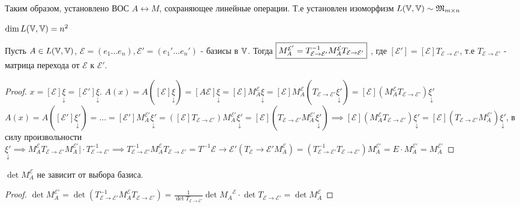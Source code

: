 \documentclass[../main.tex]{subfiles}
\begin{document}
Таким образом, установлено ВОС $A \leftrightarrow M$, сохраняющее линейные операции. Т.е установлен изоморфизм $L (\mathbb{V},\mathbb{V}) \sim \mathfrak{M}_{m\times n}$
\begin{corollary}
    $\dim{L(\ensuremath{\mathbb{V}},\ensuremath{\mathbb{V}})}=n^{2}$
\end{corollary}
\begin{theorem}
    Пусть $A \in L(\mathbb{V},\mathbb{V})$, $\mathcal{E}=(e_{1} \dots e_{n}),  \mathcal{E'} = (e_{1}' \dots e_{n}')$ - базисы в $\mathbb{V}$. Тогда $\fbox{$M_{A}^{\mathcal{E'}}= T_{\mathcal{E} \to \mathcal{E'}}^{-1}  M_{A}^{\mathcal{E}}  T_{\mathcal{E} \to \mathcal{E'}}$}$\; , где $[\mathcal{E'}] = [\mathcal{E}]T_{\mathcal{E} \to \mathcal{E'}}$, т.е $T_{\mathcal{E} \to \mathcal{E'}}$ - матрица перехода от $\mathcal{E}$ к $\mathcal{E'}$.
\end{theorem}
\begin{proof}
    $x= [\mathcal{E}]\underset{\downarrow}{\xi}= [\mathcal{E'}]\underset{\downarrow}{\xi}$. $A(x)= A([\mathcal{E}]\underset{\downarrow}{\xi})= [A\mathcal{E}] \underset{\downarrow}{\xi} = [\mathcal{E}]M_{A}^{\mathcal{E}}\underset{\downarrow}{\xi} = [\mathcal{E}]M_{A}^{\mathcal{E}}(T_{\mathcal{E}\to\mathcal{E'}} \underset{\downarrow}{\xi'}) = [\mathcal{E}](M_{A}^{\mathcal{E}}T_{\mathcal{E}\to\mathcal{E'}})\underset{\downarrow}{\xi'}$
    \\$A(x)=A([\mathcal{E'}]\underset{\downarrow}{\xi'})=\dots=[\mathcal{E'}]M_{A}^{\mathcal{E'}}\underset{\downarrow}{\xi'}= ([\mathcal{E}]T_{\mathcal{E}\to\mathcal{E'}})M_{A}^{\mathcal{E'}}\underset{\downarrow}{\xi'}= [\mathcal{E}](T_{\mathcal{E}\to\mathcal{E'}}M_{A}^{\mathcal{E'}}\underset{\downarrow}{\xi'})\implies [\mathcal{E}](M_{A}^{\mathcal{E}}T_{\mathcal{E}\to\mathcal{E'}})\underset{\downarrow}{\xi'}= [\mathcal{E}](T_{\mathcal{E}\to \mathcal{E'}}M_{A}^{\mathcal{E'}})\underset{\downarrow}{\xi'}$, в силу произвольности $\underset{\downarrow}{\xi'}\implies M_{A}^{\mathcal{E}}T_{\mathcal{E}\to\mathcal{E'}}M_{A}^{\mathcal{E'}} \bigg| \cdot T^{-1}_{\mathcal{E}\to\mathcal{E'}}\implies T^{-1}_{\mathcal{E}\to\mathcal{E'}}M_{A}^{\mathcal{E}}T_{\mathcal{E}\to\mathcal{E'}}= T^{-1}\mathcal{\mathcal{E}\to\mathcal{E'}}(T_{\mathcal{E}}\to\mathcal{E'}M_{A}^{\mathcal{E}}) = (T^{-1}_{\mathcal{E}\to\mathcal{E'}}T_{\mathcal{E}\to\mathcal{E'}})M_{A}^{\mathcal{E'}}=E \cdot M_{A}^{\mathcal{E'}}=M_{A}^{\mathcal{E'}}$
\end{proof}
\begin{corollary}
    $\det{M_{A}^{\mathcal{E}}}$ не зависит от выбора базиса. 
\end{corollary}
\begin{proof}
    $\det{ M_{A}^{\mathcal{E'}}}= \det{(T^{-1}_{\mathcal{E}\to\mathcal{E'}}M_{A}^{\mathcal{E}}T_{\mathcal{E}\to\mathcal{E'}})} = \frac{1}{\det{T_{\mathcal{E}\to\mathcal{E'}}}} \det{M_{A}}^{\mathcal{E}}\cdot\det{T_{\mathcal{E}\to\mathcal{E'}}}=\det{M_{A}^{\mathcal{E}}}$
\end{proof}
\end{document}
